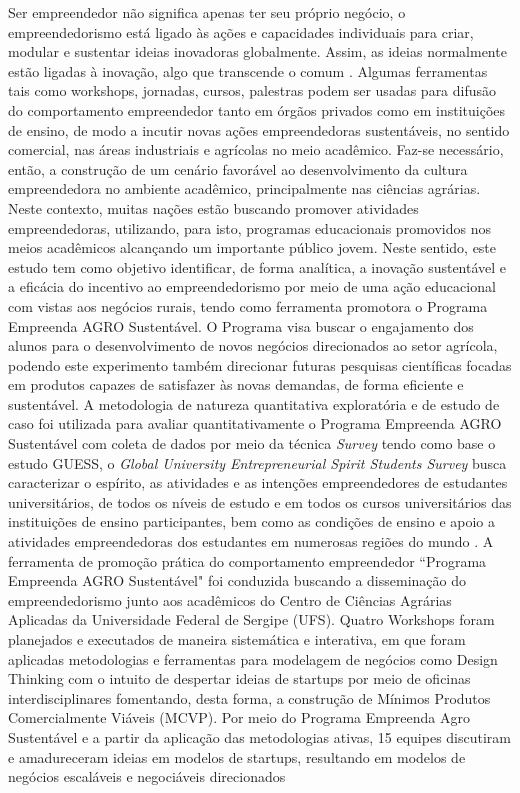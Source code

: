 \setlength{\absparsep}{18pt} %
\begin{resumo}

Ser empreendedor não significa apenas ter seu próprio negócio, o empreendedorismo está ligado às ações e capacidades individuais para criar, modular e sustentar ideias inovadoras globalmente. Assim, as ideias normalmente estão ligadas à inovação, algo que transcende o comum \cite{dornelas_empreendedorismo_2007}. Algumas ferramentas tais como workshops, jornadas, cursos, palestras podem ser usadas para difusão do comportamento empreendedor tanto em órgãos privados como em instituições de ensino, de modo a incutir novas ações empreendedoras sustentáveis, no sentido comercial, nas áreas industriais e agrícolas no meio acadêmico. Faz-se necessário, então, a construção de um cenário favorável ao desenvolvimento da cultura empreendedora no ambiente acadêmico, principalmente nas ciências agrárias. Neste contexto, muitas nações estão buscando promover atividades empreendedoras, utilizando, para isto, programas educacionais promovidos nos meios acadêmicos alcançando um importante público jovem. Neste sentido, este estudo tem como objetivo identificar, de forma analítica, a inovação sustentável e a eficácia do incentivo ao empreendedorismo por meio de uma ação educacional com vistas aos negócios rurais, tendo como ferramenta promotora o Programa Empreenda AGRO Sustentável. O Programa visa buscar o engajamento dos alunos para o desenvolvimento de novos negócios direcionados ao setor agrícola, podendo este experimento também direcionar futuras pesquisas científicas focadas em produtos capazes de satisfazer às novas demandas, de forma eficiente e sustentável. A metodologia de natureza quantitativa exploratória e de estudo de caso foi utilizada para avaliar quantitativamente o Programa Empreenda AGRO Sustentável com coleta de dados por meio da técnica \textit{Survey} tendo como base o estudo GUESS, o \textit{Global University Entrepreneurial Spirit Students Survey} busca caracterizar o espírito, as atividades e as intenções empreendedores de estudantes universitários, de todos os níveis de estudo e em todos os cursos universitários das instituições de ensino participantes, bem como as condições de ensino e apoio a atividades empreendedoras dos estudantes em numerosas regiões do mundo \cite{sieger_global_2018}. A ferramenta de promoção prática do comportamento empreendedor “Programa Empreenda AGRO Sustentável" foi conduzida buscando a disseminação do empreendedorismo junto aos acadêmicos do Centro de Ciências Agrárias Aplicadas da Universidade Federal de Sergipe (UFS). Quatro Workshops foram planejados e executados de maneira sistemática e interativa, em que foram aplicadas metodologias e ferramentas para modelagem de negócios como Design Thinking com o intuito de despertar ideias de startups por meio de oficinas interdisciplinares fomentando, desta forma, a construção de Mínimos Produtos Comercialmente Viáveis (MCVP). Por meio do Programa Empreenda Agro Sustentável e a partir da aplicação das metodologias ativas, 15 equipes discutiram e amadureceram ideias em modelos de startups, resultando em modelos de negócios escaláveis e negociáveis direcionados 
\end{resumo}
